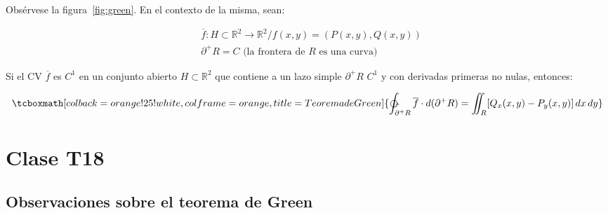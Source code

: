 \documentclass{article}
\renewcommand{\Bbb}{\mathbb}
\begin{document}
Obsérvese la figura~\ref{fig:green}. En el contexto de la misma, sean:

\begin{align}
& \overline{f}:H \subset \Bbb R^2 \rightarrow \Bbb R^2 / f(x,y) = (P(x,y), Q(x,y)) \\
& \partial^+ R = C \text{ (la frontera de } R \text{ es una curva)}
\end{align}

Si el CV $\overline{f}$ es $C^1$ en un conjunto abierto $H \subset \Bbb R^2$ que contiene a un lazo simple $\partial^+ R$ $C^1$ y con derivadas primeras no nulas, entonces:

\begin{equation}
\tcboxmath[colback=orange!25!white,colframe=orange, title=Teorema de Green]
{ \ointctrclockwise_{\partial^+ R} \overline{f} \cdot \mathop{d(\partial^+R)} = \iint_R [Q_x(x,y) - P_y(x,y)] \mathop{dx} \mathop{dy} }
\end{equation}

\section{Clase T18}

\subsection{Observaciones sobre el teorema de Green}
\end{document}
